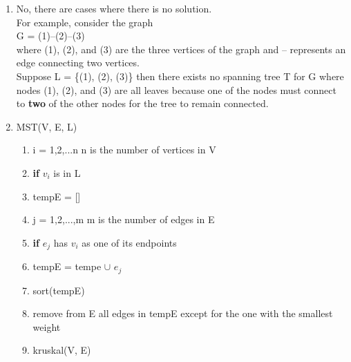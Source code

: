 \documentclass[11pt,twoside]{article}
\begin{document}
\begin{enumerate}[leftmargin=0pt,label=(\alph*)]
\item No, there are cases where there is no solution.\\
For example, consider the graph\\
G = (1)--(2)--(3)\\
where (1), (2), and (3) are the three vertices of the graph and -- represents an edge connecting two vertices.\\
Suppose L = \{(1), (2), (3)\} then there exists no spanning tree T for G where nodes (1), (2), and (3) are all leaves because one of the nodes must connect to {\bf two} of the other nodes for the tree to remain connected.

\item MST(V, E, L)\hspace{26mm}
    \begin{enumerate}[leftmargin=10pt,label=\arabic*]
    \item\hspace{2mm}{\bf for} i = 1,2,...n \hspace{5mm}n is the number of vertices in V
    \item\hspace{2mm}\hspace{5mm} {\bf if} $v_{i}$ is in L
    \item\hspace{2mm}\hspace{5mm} \hspace{5mm}tempE = []
    \item\hspace{2mm}\hspace{5mm} \hspace{5mm}{\bf for} j = 1,2,...,m \hspace{5mm}m is the number of edges in E
    \item\hspace{2mm}\hspace{5mm} \hspace{5mm}\hspace{5mm} {\bf if} $e_{j}$ has $v_{i}$ as one of its endpoints
    \item\hspace{2mm}\hspace{5mm} \hspace{5mm}\hspace{5mm} \hspace{5mm} tempE = tempe $\cup$ $e_{j}$
    \item\hspace{2mm}\hspace{5mm} sort(tempE)
    \item\hspace{2mm}\hspace{5mm} remove from E all edges in tempE except for the one with the smallest weight
    \item\hspace{2mm}kruskal(V, E)
    \end{enumerate}


\end{enumerate}
\end{document}
